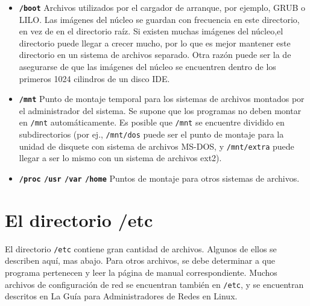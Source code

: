 \documentclass[12pt]{article}
\begin{document}
\begin{itemize}
	
	\item \textbf{\texttt{/boot}}
	 Archivos utilizados por el cargador de arranque, por
	ejemplo, GRUB o LILO. Las imágenes del núcleo se guardan con
	frecuencia en este directorio, en vez de en el directorio raíz. Si
	existen 		muchas imágenes del núcleo,el directorio puede
	llegar a crecer mucho, por 		lo que es mejor mantener este
	directorio en un sistema de archivos 			separado. Otra
	razón puede ser la de asegurarse de que las imágenes del núcleo se
	encuentren dentro de los primeros 1024 cilindros de un disco IDE.
	

	
	\item \textbf{\texttt{/mnt}}
	 Punto de montaje temporal para los sistemas de archivos
	montados por el administrador del sistema. Se supone que los programas
	no deben montar en \texttt{/mnt} automáticamente. Es posible
	que \texttt{/mnt} se encuentre dividido en subdirectorios
	(por ej., 			\texttt{/mnt/dos} puede ser
	el punto de montaje para la unidad de disquete con sistema de archivos
	MS-DOS, y \texttt{/mnt/extra} puede llegar a ser lo mismo
	con un sistema de archivos ext2).  

	
	\item \textbf{\texttt{/proc}
	\texttt{/usr} \texttt{/var}
	\texttt{/home} }  Puntos de
	montaje para otros sistemas de archivos.
	

 \end{itemize}  




\section{ El directorio /etc}

 El directorio \texttt{/etc} contiene gran cantidad de
archivos. Algunos de ellos se describen aquí, mas abajo. Para otros archivos, se
debe determinar a que programa pertenecen y leer la página de manual
correspondiente.  Muchos archivos de configuración de red se encuentran también
en \texttt{/etc}, y se encuentran descritos en La Guía para
Administradores de Redes en Linux.  
\end{document}
